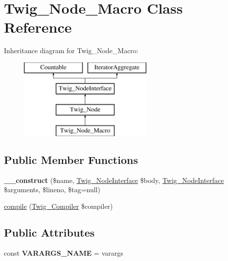 \hypertarget{classTwig__Node__Macro}{}\section{Twig\+\_\+\+Node\+\_\+\+Macro Class Reference}
\label{classTwig__Node__Macro}
Inheritance diagram for Twig\+\_\+\+Node\+\_\+\+Macro\+:\begin{figure}[H]
\begin{center}
\leavevmode
\includegraphics[height=4.000000cm]{classTwig__Node__Macro}
\end{center}
\end{figure}
\subsection*{Public Member Functions}
\begin{DoxyCompactItemize}
\item 
{\bfseries \+\_\+\+\_\+construct} (\$name, \hyperlink{interfaceTwig__NodeInterface}{Twig\+\_\+\+Node\+Interface} \$body, \hyperlink{interfaceTwig__NodeInterface}{Twig\+\_\+\+Node\+Interface} \$arguments, \$lineno, \$tag=null)\hypertarget{classTwig__Node__Macro_a95d9eb24497f4687c2db6ea61a2cef48}{}\label{classTwig__Node__Macro_a95d9eb24497f4687c2db6ea61a2cef48}

\item 
\hyperlink{classTwig__Node__Macro_ade4a55268afc85bf997ee37207defe65}{compile} (\hyperlink{classTwig__Compiler}{Twig\+\_\+\+Compiler} \$compiler)
\end{DoxyCompactItemize}
\subsection*{Public Attributes}
\begin{DoxyCompactItemize}
\item 
const {\bfseries V\+A\+R\+A\+R\+G\+S\+\_\+\+N\+A\+ME} = \textquotesingle{}varargs\textquotesingle{}\hypertarget{classTwig__Node__Macro_ab7ba1adaa2f309b5ee94a111f58234bf}{}\label{classTwig__Node__Macro_ab7ba1adaa2f309b5ee94a111f58234bf}

\end{DoxyCompactItemize}
